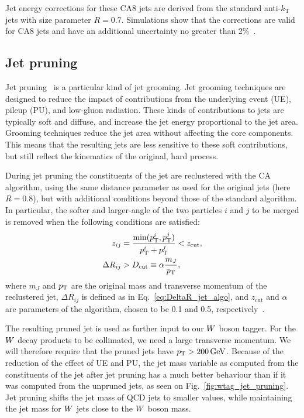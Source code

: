 Jet energy corrections for these CA8 jets are derived from the standard anti-$k_\textrm{T}$ jets
with size parameter $R=0.7$. Simulations show that the corrections are valid for CA8 jets and
have an additional uncertainty no greater than 2\%~\cite{CMS-PAS-JME-13-007}.  


\subsection{Jet pruning}

Jet pruning~\cite{Ellis:2009su,Ellis:2009me} is a particular kind of jet grooming. Jet grooming
techniques are designed to reduce the impact of contributions from the underlying event (UE), pileup
(PU), and low-\pt gluon radiation. These kinds of contributions to jets are typically soft and
diffuse, and increase the jet energy proportional to the jet area. Grooming techniques reduce the
jet area without affecting the core components. This means that the resulting jets are less
sensitive to these soft contributions, but still reflect the kinematics of the original, hard
process.


During jet pruning the constituents of the jet are reclustered with the CA algorithm, using the
same distance parameter as used for the original jets (here $R=0.8$), but with additional conditions
beyond those of the standard algorithm.
In particular, the softer and larger-angle of the two particles $i$ and $j$ to be merged is removed
when the following conditions are satisfied:
\begin{align}
  z_{ij} &= \frac{\min( p_{\mathrm{T}}^i , p_{\mathrm{T}}^j )}{p_{\mathrm{T}}^i + p_{\mathrm{T}}^j} < z_{\textrm{cut}}, \\
  \Delta R_{ij} &> D_{\textrm{cut}} \equiv \alpha \frac{m_J}{p_{\mathrm{T}}} ,
\end{align}
where $m_J$ and $p_{\mathrm{T}}$ are the original mass and transverse momentum of the reclustered jet,
$\Delta R_{ij}$ is defined as in Eq.~\ref{eq:DeltaR_jet_algo}, and
$z_\textrm{cut}$ and $\alpha$ are parameters of the algorithm, chosen to be 0.1 and 0.5,
respectively~\cite{Chatrchyan:2013vbb}. 

The resulting pruned jet is used as further input to our $W$ boson tagger. For the $W$ decay
products to be collimated, we need a large transverse momentum. We will therefore require that the
pruned jets have $p_{\mathrm{T}} > 200\,\text{Ge\hspace{-.08em}V}$. 
Because of the reduction of the effect of UE and PU, the jet mass variable as computed from the
constituents of the jet after jet pruning has a much better behaviour than if it was computed from
the unpruned jets, as seen on Fig.~\ref{fig:wtag_jet_pruning}. Jet pruning shifts the jet mass of
QCD jets
to smaller values, while maintaining the jet mass for $W$ jets close to the $W$ boson mass.

